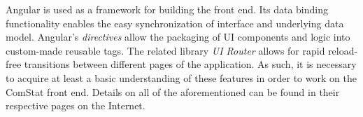 Angular is used as a framework for building the front end. Its data binding functionality enables the easy synchronization of interface and underlying data model. Angular's \emph{directives} allow the packaging of UI components and logic into custom-made reusable tags. The related library \emph{UI Router} allows for rapid reload-free transitions between different pages of the application. As such, it is necessary to acquire at least a basic understanding of these features in order to work on the ComStat front end. Details on all of the aforementioned can be found in their respective pages on the Internet.



